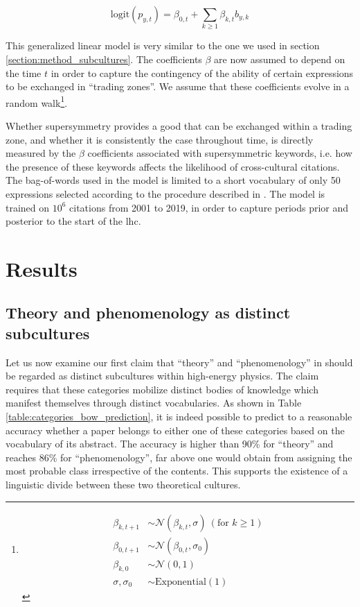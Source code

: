 \documentclass[smallextended]{svjour3}
\begin{document}
\begin{equation}
    \mathrm{logit}(p_{y,t}) = \beta_{0,t} + \sum_{k\geq 1} \beta_{k,t} b_{y,k} 
\end{equation}

This generalized linear model is very similar to the one we used in section \ref{section:method_subcultures}. The coefficients $\beta$ are now assumed to depend on the time $t$ in order to capture the contingency of the ability of certain expressions to be exchanged in ``trading zones''. We assume that these coefficients evolve in a random walk\footnote{\begin{align}
\beta_{k,t+1} &\sim \mathcal{N}(\beta_{k,t},\sigma) \ (\text{for } k \geq 1)\\
\beta_{0,t+1} &\sim \mathcal{N}(\beta_{0,t},\sigma_0)\\
\beta_{k,0} &\sim \mathcal{N}(0,1)\\
\sigma,\sigma_0 &\sim \mathrm{Exponential}(1) 
\end{align}}.

Whether supersymmetry provides a good that can be exchanged within a trading zone, and whether it is consistently the case throughout time, is directly measured by the $\beta$ coefficients associated with supersymmetric keywords, i.e. how the presence of these keywords affects the likelihood of cross-cultural citations. The bag-of-words used in the model is limited to a short vocabulary of only 50 expressions selected according to the procedure described in \citet[p.~45--49]{omodei_tel-01097702}. The model is trained on $10^6$ citations from 2001 to 2019, in order to capture periods prior and posterior to the start of the \gls{lhc}.

\section{Results}
\label{section:application}

\subsection{Theory and phenomenology as distinct subcultures}\label{section:application_subcultures}

Let us now examine our first claim that ``theory'' and ``phenomenology'' in  should be regarded as distinct subcultures within high-energy physics. The claim requires that these categories mobilize distinct bodies of knowledge which manifest themselves through distinct vocabularies. As shown in Table \ref{table:categories_bow_prediction}, it is indeed possible to predict to a reasonable accuracy whether a paper belongs to either one of these categories based on the vocabulary of its abstract. The accuracy is higher than 90\% for ``theory'' and reaches 86\% for ``phenomenology'', far above one would obtain from assigning the most probable class irrespective of the contents. This supports the existence of a linguistic divide between these two theoretical cultures.
\end{document}
